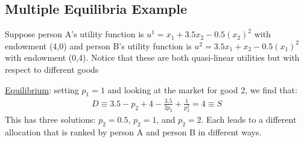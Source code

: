 \documentclass{article}
\begin{document}
\subsection{Multiple Equilibria Example}
Suppose person A's utility function is $u^{1} = x_{1} + 3.5x_{2} - 0.5(x_{2})^{2}$ with endowment (4,0) and person B's utility function is $u^{2} = 3.5x_{1} + x_{2} - 0.5(x_{1})^{2}$ with endowment (0,4). Notice that these are both quasi-linear utilities but with respect to different goods
\par \vspace{0.3em}
  \underline{Equilibrium}: setting $p_{1} = 1$ and looking at the market for good 2, we find that:
  \begin{gather*}
    D \equiv 3.5 - p_{2} + 4 - \frac{3.5}{2p_{2}} + \frac{1}{p_{2}^{2}} = 4 \equiv S
  \end{gather*}
  This has three solutions: $p_{2} = 0.5$, $p_{2} = 1$, and $p_{2} = 2$. Each leads to a different allocation that is ranked by person A and person B in different ways.
\end{document}
